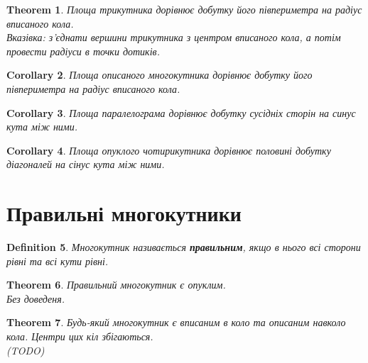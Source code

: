 \documentclass[a4paper, 10pt]{article}
\theoremstyle{theoremdd}
\newtheorem{theorem}{Theorem}[subsection]
\theoremstyle{theoremdd}
\theoremstyle{theoremdd}
\newtheorem{definition}[theorem]{Definition}
\theoremstyle{theoremdd}
\theoremstyle{theoremdd}
\theoremstyle{theoremdd}
\theoremstyle{theoremdd}
\theoremstyle{theoremdd}
\theoremstyle{theoremdd}
\newtheorem{corollary}[theorem]{Corollary}
\begin{document}
\begin{theorem}
Площа трикутника дорівнює добутку його півпериметра на радіус вписаного кола.\\
\textit{Вказівка: з'єднати вершини трикутника з центром вписаного кола, а потім провести радіуси в точки дотиків.}
\end{theorem}

\begin{corollary}
Площа описаного многокутника дорівнює добутку його півпериметра на радіус вписаного кола.
\end{corollary}

\begin{corollary}
Площа паралелограма дорівнює добутку сусідніх сторін на синус кута між ними.
\end{corollary}

\begin{corollary}
Площа опуклого чотирикутника дорівнює половині добутку діагоналей на сінус кута між ними.
\end{corollary}

\newpage
\section{Правильні многокутники}
\begin{definition}
Многокутник називається \textbf{правильним}, якщо в нього всі сторони рівні та всі кути рівні.
\end{definition}

\begin{theorem}
Правильний многокутник є опуклим.\\
\textit{Без доведеня.}
\end{theorem}

\begin{theorem}
Будь-який многокутник є вписаним в коло та описаним навколо кола. Центри цих кіл збігаються.\\
(TODO)
\end{theorem}
\end{document}
